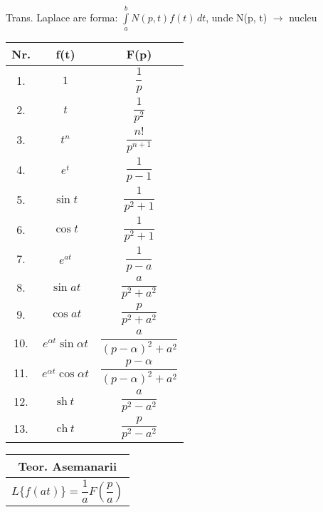\documentclass{article}
\begin{document}
\setlength{\extrarowheight}{10pt}

\noindent

Trans. Laplace are forma: $\displaystyle\int\limits_{a}^{b} N(p, t) f(t)\,dt$, unde N(p, t) $\rightarrow$ nucleu\\
\hspace*{-3cm} %
\begin{minipage}{\dimexpr\textwidth+2cm}
  \begin{tabular}{|c|c|c|}
    \hline
    \textbf{Nr.} & \textbf{f(t)}                  & \textbf{F(p)}                          \\
    \hline
    1.           & $ 1 $                          & $ \dfrac{1}{p} $                       \\
    \hline
    2.           & $ t $                          & $ \dfrac{1}{p^2} $                     \\
    \hline
    3.           & $ t^n $                        & $ \dfrac{n!}{p^{n+1}} $                \\
    \hline
    4.           & $ e^t $                        & $ \dfrac{1}{p-1} $                     \\
    \hline
    5.           & $ \sin t $                     & $ \dfrac{1}{p^2+1} $                   \\
    \hline
    6.           & $ \cos t $                     & $ \dfrac{1}{p^2+1} $                   \\
    \hline
    7.           & $ e^{at} $                     & $ \dfrac{1}{p-a} $                     \\
    \hline
    8.           & $ \sin at $                    & $ \dfrac{a}{p^2+a^2}  $                \\
    \hline
    9.           & $ \cos at $                    & $ \dfrac{p}{p^2+a^2} $                 \\
    \hline
    10.          & $ e^{\alpha t} \sin \alpha t $ & $ \dfrac{a}{(p-\alpha)^2+a^2} $        \\
    \hline
    11.          & $ e^{\alpha t} \cos \alpha t $ & $ \dfrac{p-\alpha}{(p-\alpha)^2+a^2} $ \\
    \hline
    12.          & $ \text{sh}\ t $               & $ \dfrac{a}{p^2-a^2} $                 \\
    \hline
    13.          & $ \text{ch}\ t $               & $ \dfrac{p}{p^2-a^2} $                 \\
    \hline
  \end{tabular}
  \begin{tabular}{|c|}
    \hline
    \textbf{Teor. Asemanarii}                                \\
    \hline
    $ L\{f(at)\} = \dfrac{1}{a} F\left(\dfrac{p}{a}\right) $ \\
    \hline
  \end{tabular}


\end{minipage}
\end{document}
